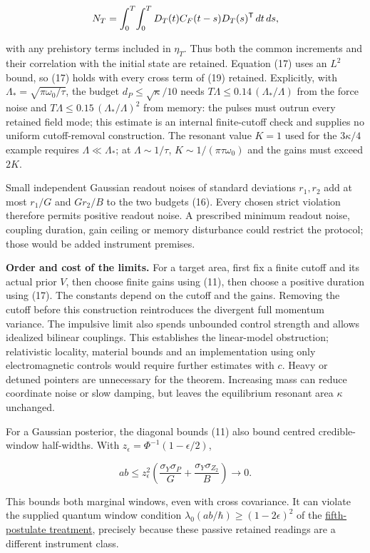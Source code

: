 \documentclass[11pt,a4paper]{article}
\begin{document}
\[N_T=\int_0^T\!\int_0^T
D_T(t)C_F(t-s)D_T(s)^{\sf T}\,dt\,ds,\]

with any prehistory terms included in \(\eta_T\). Thus both the common
increments and their correlation with the initial state are retained.
Equation (17) uses an \(L^2\) bound, so (17) holds with every cross term
of (19) retained. Explicitly, with
\(\Lambda_*=\sqrt{\pi\omega_0/\tau}\), the budget
\(d_P\le\sqrt\kappa/10\) needs \(T\Lambda\le0.14\,(\Lambda_*/\Lambda)\)
from the force noise and \(T\Lambda\le0.15\,(\Lambda_*/\Lambda)^2\) from
memory: the pulses must outrun every retained field mode; this estimate
is an internal finite-cutoff check and supplies no uniform
cutoff-removal construction. The resonant value \(K=1\) used for the
\(3\kappa/4\) example requires \(\Lambda\ll\Lambda_*\); at
\(\Lambda\sim1/\tau\), \(K\sim1/(\pi\tau\omega_0)\) and the gains must
exceed \(2K\).

Small independent Gaussian readout noises of standard deviations
\(r_1,r_2\) add at most \(r_1/G\) and \(Gr_2/B\) to the two budgets
(16). Every chosen strict violation therefore permits positive readout
noise. A prescribed minimum readout noise, coupling duration, gain
ceiling or memory disturbance could restrict the protocol; those would
be added instrument premises.

\textbf{Order and cost of the limits.} For a target area, first fix a
finite cutoff and its actual prior \(V\), then choose finite gains using
(11), then choose a positive duration using (17). The constants depend
on the cutoff and the gains. Removing the cutoff before this
construction reintroduces the divergent full momentum variance. The
impulsive limit also spends unbounded control strength and allows
idealized bilinear couplings. This establishes the linear-model
obstruction; relativistic locality, material bounds and an
implementation using only electromagnetic controls would require further
estimates with \(c\). Heavy or detuned pointers are unnecessary for the
theorem. Increasing mass can reduce coordinate noise or slow damping,
but leaves the equilibrium resonant area \(\kappa\) unchanged.

For a Gaussian posterior, the diagonal bounds (11) also bound centred
credible-window half-widths. With
\(z_\epsilon=\Phi^{-1}(1-\epsilon/2)\),

\[ab\le z_\epsilon^2\left(
\frac{\sigma_Y\sigma_P}{G}+\frac{\sigma_Y\sigma_{Z_2}}B\right)
\longrightarrow0.\tag{25}\]

This bounds both marginal windows, even with cross covariance. It can
violate the supplied quantum window condition
\(\lambda_0(ab/\hbar)\ge(1-2\epsilon)^2\) of the
\href{principia-fifth-postulate.md}{fifth-postulate treatment},
precisely because these passive retained readings are a different
instrument class.
\end{document}
